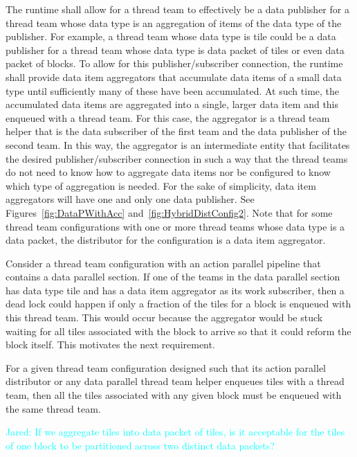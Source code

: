 \documentclass{article}
\newcommand{\Jared}[1]          {\textcolor{cyan}{Jared: #1}}
\begin{document}
\begin{req}
The runtime shall allow for a thread team to effectively be a data publisher for
a thread team whose data type is an aggregation of items of the data type of the
publisher.  For example, a thread team whose data type is tile could be a data
publisher for a thread team whose data type is data packet of tiles or even data
packet of blocks.  To allow for this publisher/subscriber connection, the
runtime shall provide data item aggregators that accumulate data items of a
small data type until sufficiently many of these have been accumulated.  At such
time, the accumulated data items are aggregated into a single, larger data item
and this enqueued with a thread team.  For this case, the aggregator is a thread
team helper that is the data subscriber of the first team and the data publisher
of the second team.  In this way, the aggregator is an intermediate entity that
facilitates the desired publisher/subscriber connection in such a way that the
thread teams do not need to know how to aggregate data items nor be configured
to know which type of aggregation is needed.  For the sake of simplicity, data
item aggregators will have one and only one data publisher.  See Figures~\ref{fig:DataPWithAcc}
and~\ref{fig:HybridDistConfig2}.  Note that for some thread team configurations
with one or more thread teams whose data type is a data packet, the distributor
for the configuration is a data item aggregator.
\end{req}

Consider a thread team configuration with an action parallel pipeline that
contains a data parallel section.  If one of the teams in the data parallel
section has data type tile and has a data item aggregator as its work
subscriber, then a dead lock could happen if only a fraction of the tiles for a
block is enqueued with this thread team.  This would occur because the
aggregator would be stuck waiting for all tiles associated with the block to
arrive so that it could reform the block itself.  This motivates the next
requirement.

\begin{req}
For a given thread team configuration designed such that its action parallel
distributor or any data parallel thread team helper enqueues tiles with a thread
team, then all the tiles associated with any given block must be enqueued with
the same thread team.
\end{req}

\Jared{If we aggregate tiles into data packet of tiles, is it acceptable for the
tiles of one block to be partitioned across two distinct data packets?}
\end{document}
